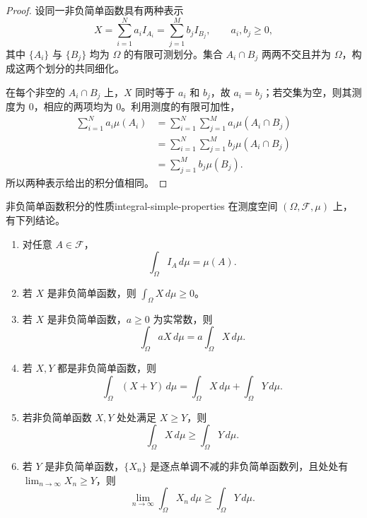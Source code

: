 \begin{proof}
设同一非负简单函数具有两种表示
\[
X=\sum_{i=1}^N a_iI_{A_i}
 =\sum_{j=1}^M b_jI_{B_j},\qquad a_i,b_j\geq0,
\]
其中 $\{A_i\}$ 与 $\{B_j\}$ 均为 $\Omega$ 的有限可测划分。集合 $A_i\cap B_j$ 两两不交且并为 $\Omega$，构成这两个划分的共同细化。

在每个非空的 $A_i\cap B_j$ 上，$X$ 同时等于 $a_i$ 和 $b_j$，故 $a_i=b_j$；若交集为空，则其测度为 $0$，相应的两项均为 $0$。利用测度的有限可加性，
\begin{align*}
\sum_{i=1}^N a_i\mu(A_i)
&=\sum_{i=1}^N\sum_{j=1}^M a_i\mu(A_i\cap B_j)\\
&=\sum_{i=1}^N\sum_{j=1}^M b_j\mu(A_i\cap B_j)\\
&=\sum_{j=1}^M b_j\mu(B_j).
\end{align*}
所以两种表示给出的积分值相同。
\end{proof}

\begin{proposition}{非负简单函数积分的性质}{integral-simple-properties}
在测度空间 $(\Omega,\mathcal F,\mu)$ 上，有下列结论。
\begin{enumerate}
\item 对任意 $A\in\mathcal F$，
\[
\int_\Omega I_A\,d\mu=\mu(A).
\]
\item 若 $X$ 是非负简单函数，则 $\int_\Omega X\,d\mu\geq0$。
\item 若 $X$ 是非负简单函数，$a\geq0$ 为实常数，则
\[
\int_\Omega aX\,d\mu=a\int_\Omega X\,d\mu.
\]
\item 若 $X,Y$ 都是非负简单函数，则
\[
\int_\Omega(X+Y)\,d\mu
=\int_\Omega X\,d\mu+\int_\Omega Y\,d\mu.
\]
\item 若非负简单函数 $X,Y$ 处处满足 $X\geq Y$，则
\[
\int_\Omega X\,d\mu\geq\int_\Omega Y\,d\mu.
\]
\item 若 $Y$ 是非负简单函数，$\{X_n\}$ 是逐点单调不减的非负简单函数列，且处处有 $\lim_{n\to\infty}X_n\geq Y$，则
\[
\lim_{n\to\infty}\int_\Omega X_n\,d\mu
\geq\int_\Omega Y\,d\mu.
\]
\end{enumerate}
\end{proposition}

